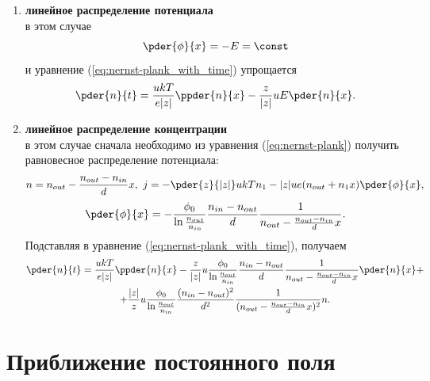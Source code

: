     \begin{enumerate}
        \item \textbf{линейное распределение потенциала}\\
            в этом случае
            \[
                \pder{\phi}{x} = -E = \const
            \]
            и уравнение (\ref{eq:nernst-plank_with_time}) упрощается
            \begin{equation}
                \pder{n}{t} = \frac{ukT}{e|z|}\ppder{n}{x} -
                    \frac{z}{|z|}uE\pder{n}{x}.
            \end{equation}
        \item \textbf{линейное распределение концентрации}\\
            в этом случае сначала необходимо из уравнения
            (\ref{eq:nernst-plank}) получить равновесное распределение
            потенциала:
            \[
                n = n_{out} - \frac{n_{out} - n_{in}}{d} x,\ j = -\pder{z}{|z|}ukTn_1 -
                    |z|ue(n_{out}+n_1x)\pder{\phi}{x},
            \]
            \[
                \pder{\phi}{x} = -\frac{\phi_0}{\ln\frac{n_{out}}{n_{in}}}
                \frac{n_{in} - n_{out}}{d}
                \frac{1}{n_{out} - \frac{n_{out} - n_{in}}{d} x}.
            \]
            Подставляя в уравнение (\ref{eq:nernst-plank_with_time}), получаем
            \begin{gather}
                \pder{n}{t} = \frac{ukT}{e|z|}\ppder{n}{x} -
                \frac{z}{|z|}u\frac{\phi_0}{\ln\frac{n_{out}}{n_{in}}}
                \frac{n_{in} - n_{out}}{d}
                \frac{1}{n_{out} - \frac{n_{out} - n_{in}}{d} x}
                \pder{n}{x} + \nonumber \\
                + \frac{|z|}{z}u\frac{\phi_0}{\ln\frac{n_{out}}{n_{in}}}
                \frac{(n_{in} - n_{out})^2}{d^2}
                \frac{1}{(n_{out} - \frac{n_{out} - n_{in}}{d} x)^2}n.
            \end{gather}
    \end{enumerate}

\section{Приближение постоянного поля}
